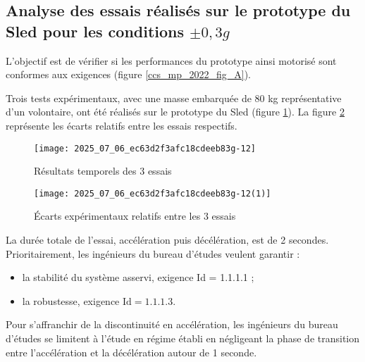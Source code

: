 

\subsection{Analyse des essais réalisés sur le prototype du Sled pour les conditions $\pm 0,3 g$}

\begin{obj}
L'objectif est de vérifier si les performances du prototype ainsi motorisé sont conformes aux exigences (figure \ref{ccs_mp_2022_fig_A}).
\end{obj}

Trois tests expérimentaux, avec une masse embarquée de 80 kg représentative d'un volontaire, ont été réalisés sur le prototype du Sled (figure \ref{ccs_mp_2022_fig_16}). La figure \ref{ccs_mp_2022_fig_17} représente les écarts relatifs entre les essais respectifs.\\


\begin{figure}[!h]
\centering
\texttt{[image: 2025\_07\_06\_ec63d2f3afc18cdeeb83g-12]}
\caption{\label{ccs_mp_2022_fig_16}Résultats temporels des 3 essais}
\end{figure}


\begin{figure}[!h]
\centering\texttt{[image: 2025\_07\_06\_ec63d2f3afc18cdeeb83g-12(1)]}
\caption{\label{ccs_mp_2022_fig_17}Écarts expérimentaux relatifs entre les 3 essais}
\end{figure}



La durée totale de l'essai, accélération puis décélération, est de 2 secondes.\\
Prioritairement, les ingénieurs du bureau d'études veulent garantir :

\begin{itemize}
  \item la stabilité du système asservi, exigence Id = 1.1.1.1 ;
  \item la robustesse, exigence $\mathrm{Id}=1.1 .1 .3$.
\end{itemize}

Pour s'affranchir de la discontinuité en accélération, les ingénieurs du bureau d'études se limitent à l'étude en régime établi en négligeant la phase de transition entre l'accélération et la décélération autour de 1 seconde.

